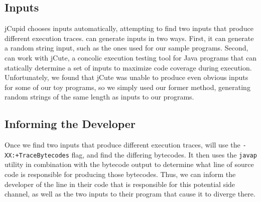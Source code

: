 

\subsection{Inputs}

jCupid chooses inputs automatically, attempting to find two inputs that produce
different execution traces. \jcupid can generate inputs in two ways. First, it
can generate a random string input, such as the ones used for our sample
programs. Second, \jcupid can work with jCute, a concolic execution testing tool
for Java programs that can statically determine a set of inputs to maximize code
coverage during execution. Unfortunately, we found that jCute was unable to
produce even obvious inputs for some of our toy programs, so we simply used our
former method, generating random strings of the same length as inputs to our
programs.


\subsection{Informing the Developer}

Once we find two inputs that produce different execution traces, \jcupid will
use the \texttt{-XX:+TraceBytecodes} flag, and find the differing bytecodes. It
then uses the \texttt{javap} utility in combination with the bytecode output to
determine what line of source code is responsible for producing those bytecodes.
Thus, we can inform the developer of the line in their code that is responsible
for this potential side channel, as well as the two inputs to their program that
cause it to diverge there.


%

